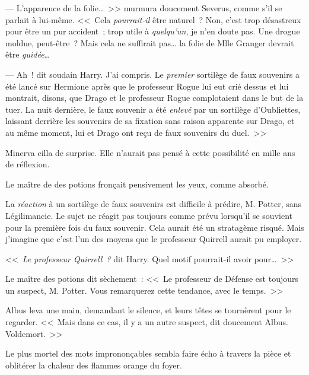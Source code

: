 --- L'apparence de la folie…~>> murmura doucement Severus, comme s'il se parlait à lui-même. <<~Cela \emph{pourrait-il} être naturel~? Non, c'est trop désastreux pour être un pur accident~; trop utile à \emph{quelqu'un}, je n'en doute pas. Une drogue moldue, peut-être~? Mais cela ne suffirait pas… la folie de Mlle Granger devrait être \emph{guidée}…

--- Ah~! dit soudain Harry. J'ai compris. Le \emph{premier} sortilège de faux souvenirs a été lancé sur Hermione après que le professeur Rogue lui eut crié dessus et lui montrait, disons, que Drago et le professeur Rogue complotaient dans le but de la tuer. La nuit dernière, le faux souvenir a été \emph{enlevé} par un sortilège d'Oubliettes, laissant derrière les souvenirs de sa fixation sans raison apparente sur Drago, et au même moment, lui et Drago ont reçu de faux souvenirs du duel.~>>

Minerva cilla de surprise. Elle n'aurait pas pensé à cette possibilité en mille ans de réflexion.

Le maître de des potions fronçait pensivement les yeux, comme absorbé.

La \emph{réaction} à un sortilège de faux souvenirs est difficile à prédire, M. Potter, sans Légilimancie. Le sujet ne réagit pas toujours comme prévu lorsqu'il se souvient pour la première fois du faux souvenir. Cela aurait été un stratagème risqué. Mais j'imagine que c'est l'un des moyens que le professeur Quirrell aurait pu employer.

<<~\emph{Le professeur Quirrell~?} dit Harry. Quel motif pourrait-il avoir pour…~>>

Le maître des potions dit sèchement~: <<~Le professeur de Défense est toujours un suspect, M. Potter. Vous remarquerez cette tendance, avec le temps.~>>

Albus leva une main, demandant le silence, et leurs têtes se tournèrent pour le regarder. <<~Mais dans ce cas, il y a un autre suspect, dit doucement Albus. Voldemort.~>>

Le plus mortel des mots imprononçables sembla faire écho à travers la pièce et oblitérer la chaleur des flammes orange du foyer.

